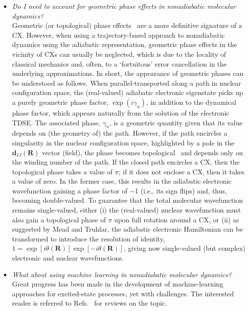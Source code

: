 \documentclass[9pt,bestpractices,pubversion]{livecoms}
\newcommand{\R}{\mathbf{R}}
\newcommand{\nacv}[2]{\mathbf{d}_{#1#2}(\R)}
\begin{document}
\begin{itemize}
\item{\textit{Do I need to account for geometric phase effects in nonadiabatic molecular dynamics?} \\
Geometric (or topological) phase effects~\cite{mead_determination_1979, berry_quantal_1984} are a more definitive signature of a CX. However, when using a trajectory-based approach to nonadiabatic dynamics using the adiabatic representation, geometric phase effects in the vicinity of CXs can usually be neglected, which is due to the locality of classical mechanics and, often, to a `fortuitous' error cancellation in the underlying approximations.\cite{ryabinkin2017geometric,ibele2021diabolical,ryabinkin2014we} In short, the appearance of geometric phases can be understood as follows. When parallel-transported along a path in nuclear configuration space, the (real-valued) adiabatic electronic eigenstate picks up a purely geometric phase factor, $\exp{(i\gamma_n)}$, in addition to the dynamical phase factor, which appears naturally from the solution of the electronic TDSE.\cite{tannor2007approximate} The associated phase, $\gamma_n$, is a geometric quantity given that its value depends on (the geometry of) the path.\cite{daggett2024toward, ibele2023nature} However, if the path encircles a singularity in the nuclear configuration space, highlighted by a pole in the $\nacv{I}{J}$ vector (field), the phase becomes topological~\cite{daggett2024toward} and depends only on the winding number of the path.\cite{ibele2023nature} If the closed path encircles a CX, then the topological phase takes a value of $\pi$; if it does not enclose a CX, then it takes a value of zero.\cite{mead_geometric_1992} In the former case, this results in the adiabatic electronic wavefunction gaining a phase factor of $-$1 (i.e., its sign flips) and, thus, becoming double-valued.\cite{longuet-higgins_studies_1958, herzberg_intersection_1963}  To guarantee that the total molecular wavefunction remains single-valued, either (i) the (real-valued) nuclear wavefunction must also gain a topological phase of $\pi$ upon full rotation around a CX,\cite{tannor2007molecular} or (ii) as suggested by Mead and Truhlar,\cite{mead_determination_1979} the adiabatic electronic Hamiltonian can be transformed to introduce the resolution of identity, $1 = \exp{[i\theta(\R)]} \exp{[-i\theta(\R)]}$, giving now single-valued (but complex) electronic and nuclear wavefunctions.\cite{tannor2007molecular, ryabinkin2017geometric} 
}

\item{\textit{What about using machine learning in nonadiabatic molecular dynamics?} \\
Great progress has been made in the development of machine-learning approaches for excited-state processes, yet with challenges. The interested reader is referred to Refs.~ for reviews on the topic. 
}


\end{itemize}
\end{document}
